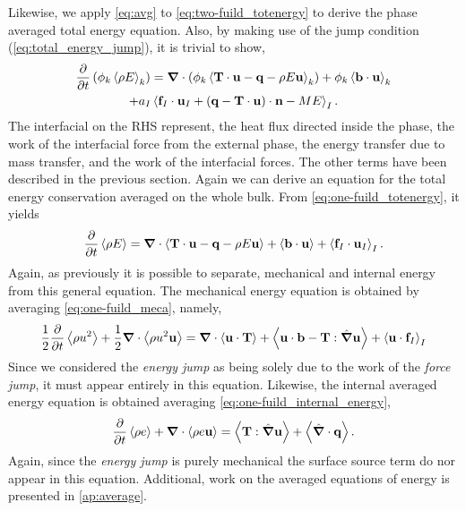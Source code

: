 Likewise, we apply \ref{eq:avg} to \ref{eq:two-fuild_totenergy} to derive the phase averaged total energy equation.
Also, by making use of the jump condition (\ref{eq:total_energy_jump}), it is trivial to show, 
\begin{multline}
    \frac{\partial}{\partial t} \left(
        \phi_k\left<\rho E\right>_k
    \right)
    = \bm{\nabla} \cdot \left(
        \phi_k\left<\textbf{T}\cdot\textbf{u}
        - \textbf{q}
        - \rho E \textbf{u} \right>_k
    \right)
    + \phi_k\left<\textbf{b}\cdot\textbf{u}\right>_k \\
    +a_I \left<
        \textbf{f}_I\cdot\textbf{u}_I
        + \left(
        \textbf{q}
        - \textbf{T}\cdot\textbf{u}
        \right) 
        \cdot\textbf{n}
        -M E\right>_I.
    \label{eq:avg_k_total_energy}
\end{multline}
The interfacial on the RHS represent, the heat flux directed inside the phase,
the work of the interfacial force from the external phase, the energy transfer due 
to mass transfer, and the work of the interfacial forces.
The other terms have been described in the previous section. 
Again we can derive an equation for the total energy conservation averaged on the whole bulk. 
From \ref{eq:one-fuild_totenergy}, it yields
\begin{equation}
    \frac{\partial}{\partial t} \left<\rho E\right>
    = \bm{\nabla} \cdot 
        \left<\textbf{T}\cdot\textbf{u}
        - \textbf{q}
        - \rho E \textbf{u}\right>
    + \left<\textbf{b}\cdot\textbf{u}\right>
    + \left<\textbf{f}_I\cdot\textbf{u}_I\right>_I.
    \label{eq:avg_totenergy}
\end{equation}
Again, as previously it is possible to separate, mechanical and internal energy from this general equation. 
The mechanical energy equation is obtained by averaging \ref{eq:one-fuild_meca}, namely,
\begin{equation}
    \frac{1}{2}\frac{\partial }{\partial t}
            \left<\rho u^2\right>
    + \frac{1}{2}\bm{\nabla} \cdot 
            \left<\rho u^2 \textbf{u}\right>
    = \bm{\nabla}\cdot\left<\textbf{u}\cdot \textbf{T}\right>
    +\left<\textbf{u}\cdot\textbf{b} - \textbf{T}: \hat{\bm{\nabla}}\textbf{u}\right>
    +\left<\textbf{u}\cdot\textbf{f}_I\right>_I
\end{equation}
Since we considered the \textit{energy jump} as being solely due to the work of the \textit{force jump}, it must appear entirely in this equation. 
Likewise, the internal averaged energy equation is obtained averaging \ref{eq:one-fuild_internal_energy},
\begin{equation}
    \frac{\partial}{\partial t} \left<\rho e\right>
    + \bm{\nabla} \cdot \left<\rho  e\textbf{u}\right>
    = \left<\textbf{T}:\hat{\bm{\nabla}}\textbf{u}\right>
    + \left<\hat{\bm{\nabla}}\cdot\textbf{q}\right>.
\end{equation}
Again, since the \textit{energy jump} is purely mechanical the surface source term do nor appear in this equation. 
Additional, work on the averaged equations of energy is presented in \ref{ap:average}.
